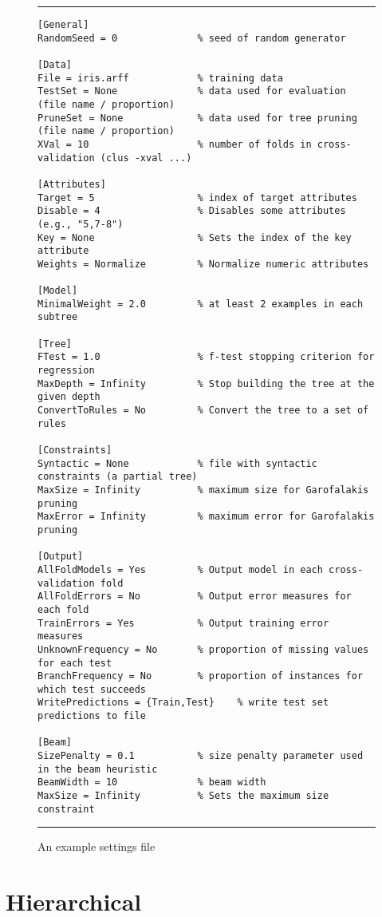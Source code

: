 \begin{figure}
\hrule
\begin{verbatim}
[General]
RandomSeed = 0              % seed of random generator

[Data]
File = iris.arff            % training data
TestSet = None              % data used for evaluation (file name / proportion)
PruneSet = None             % data used for tree pruning (file name / proportion)
XVal = 10                   % number of folds in cross-validation (clus -xval ...)

[Attributes]
Target = 5                  % index of target attributes
Disable = 4                 % Disables some attributes (e.g., "5,7-8")
Key = None                  % Sets the index of the key attribute
Weights = Normalize         % Normalize numeric attributes

[Model]
MinimalWeight = 2.0         % at least 2 examples in each subtree
         
[Tree]
FTest = 1.0                 % f-test stopping criterion for regression
MaxDepth = Infinity         % Stop building the tree at the given depth
ConvertToRules = No         % Convert the tree to a set of rules

[Constraints]
Syntactic = None            % file with syntactic constraints (a partial tree)
MaxSize = Infinity          % maximum size for Garofalakis pruning
MaxError = Infinity         % maximum error for Garofalakis pruning

[Output]
AllFoldModels = Yes         % Output model in each cross-validation fold
AllFoldErrors = No          % Output error measures for each fold
TrainErrors = Yes           % Output training error measures
UnknownFrequency = No       % proportion of missing values for each test
BranchFrequency = No        % proportion of instances for which test succeeds
WritePredictions = {Train,Test}    % write test set predictions to file

[Beam]
SizePenalty = 0.1           % size penalty parameter used in the beam heuristic
BeamWidth = 10              % beam width
MaxSize = Infinity          % Sets the maximum size constraint
\end{verbatim}
\hrule
\caption{An example settings file}
\label{settings:fig}
\end{figure}


\section{Hierarchical}

